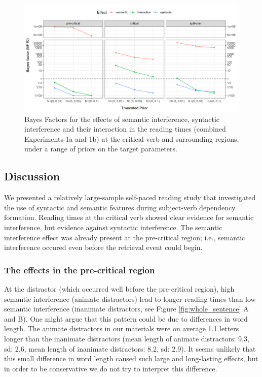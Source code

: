 \documentclass[a4paper, man, floatsintext]{apa7}
\begin{document}
\begin{figure}[H]
    \caption{Bayes Factors for the effects of semantic interference, syntactic interference and their interaction in the reading times (combined Experiments 1a and 1b) at the critical verb and surrounding regions, under a range of priors on the target parameters.}
    \label{fig:spr_bfs}
    \centering
    \includegraphics[width=\textwidth]{images/BF_plot_spr_774_allregions.png}
\end{figure}

\subsection{Discussion}
We presented a relatively large-sample self-paced reading study that investigated the use of syntactic and semantic features during subject-verb dependency formation. Reading times at the critical verb showed clear evidence for semantic interference, but evidence against syntactic interference. The semantic interference effect was already present at the pre-critical region; i.e., semantic interference occured even before the retrieval event could begin. 

\subsubsection{The effects in the pre-critical region}

At the distractor (which occurred well before the pre-critical region), high semantic interference (animate distractors) lead to longer reading times than low semantic interference (inanimate distractors, see Figure \ref{fig:whole_sentence} A and B). One might argue that this pattern could be due to differences in word length. The animate distractors in our materials were on average 1.1 letters longer than the inanimate distractors (mean length of animate distractors: 9.3, sd: 2.6, mean length of inanimate distractors: 8.2, sd: 2.9). It seems unlikely that this small difference in word length caused such large and long-lasting effects, but in order to be conservative we do not try to interpret this difference.
\end{document}
